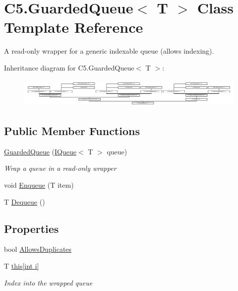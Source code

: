 \hypertarget{class_c5_1_1_guarded_queue}{}\section{C5.\+Guarded\+Queue$<$ T $>$ Class Template Reference}
\label{class_c5_1_1_guarded_queue}


A read-\/only wrapper for a generic indexable queue (allows indexing).  


Inheritance diagram for C5.\+Guarded\+Queue$<$ T $>$\+:\begin{figure}[H]
\begin{center}
\leavevmode
\includegraphics[height=1.441441cm]{class_c5_1_1_guarded_queue}
\end{center}
\end{figure}
\subsection*{Public Member Functions}
\begin{DoxyCompactItemize}
\item 
\hyperlink{class_c5_1_1_guarded_queue_ad8348b6d959ee703bf5b91b4885ae28f}{Guarded\+Queue} (\hyperlink{interface_c5_1_1_i_queue}{I\+Queue}$<$ T $>$ queue)
\begin{DoxyCompactList}\small\item\em Wrap a queue in a read-\/only wrapper \end{DoxyCompactList}\item 
void \hyperlink{class_c5_1_1_guarded_queue_af8b4a6e503df67d019015f2ccce7c06b}{Enqueue} (T item)
\item 
T \hyperlink{class_c5_1_1_guarded_queue_aeac8a6ef430740f2ec1df8346cd122a4}{Dequeue} ()
\end{DoxyCompactItemize}
\subsection*{Properties}
\begin{DoxyCompactItemize}
\item 
bool \hyperlink{class_c5_1_1_guarded_queue_a859d295a8e0e99348ddb273b88d33b15}{Allows\+Duplicates}
\item 
T \hyperlink{class_c5_1_1_guarded_queue_a5c18da3f129993454969b145f1fce822}{this\mbox{[}int i\mbox{]}}
\begin{DoxyCompactList}\small\item\em Index into the wrapped queue \end{DoxyCompactList}\end{DoxyCompactItemize}
